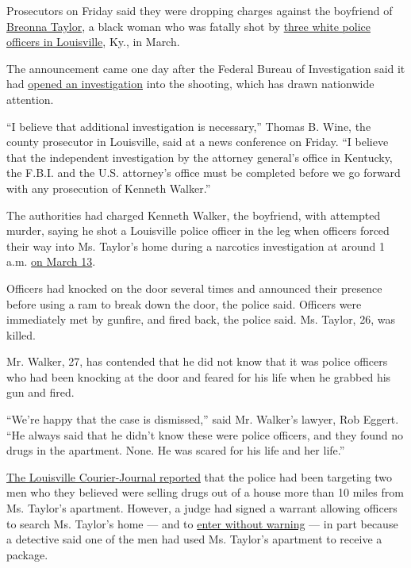 Prosecutors on Friday said they were dropping charges against the
boyfriend of
\href{https://www.nytimes3xbfgragh.onion/2020/08/30/us/breonna-taylor-police-killing.html}{Breonna
Taylor}, a black woman who was fatally shot by
\href{https://www.nytimes3xbfgragh.onion/2020/06/19/us/brett-hankison-breonna-taylor-louisville.html}{three
white police officers in Louisville}, Ky., in March.

The announcement came one day after the Federal Bureau of Investigation
said it had
\href{https://www.nytimes3xbfgragh.onion/2020/05/21/us/fbi-louisville-shooting.html}{opened
an investigation} into the shooting, which has drawn nationwide
attention.

``I believe that additional investigation is necessary,'' Thomas B.
Wine, the county prosecutor in Louisville, said at a news conference on
Friday. ``I believe that the independent investigation by the attorney
general's office in Kentucky, the F.B.I. and the U.S. attorney's office
must be completed before we go forward with any prosecution of Kenneth
Walker.''

The authorities had charged Kenneth Walker, the boyfriend, with
attempted murder, saying he shot a Louisville police officer in the leg
when officers forced their way into Ms. Taylor's home during a narcotics
investigation at around 1 a.m.
\href{https://www.courier-journal.com/story/news/crime/2020/03/13/louisville-police-officer-shot-suspect-killed-springfield-drive/5040349002/}{on
March 13}.

Officers had knocked on the door several times and announced their
presence before using a ram to break down the door, the police said.
Officers were immediately met by gunfire, and fired back, the police
said. Ms. Taylor, 26, was killed.

Mr. Walker, 27, has contended that he did not know that it was police
officers who had been knocking at the door and feared for his life when
he grabbed his gun and fired.

``We're happy that the case is dismissed,'' said Mr. Walker's lawyer,
Rob Eggert. ``He always said that he didn't know these were police
officers, and they found no drugs in the apartment. None. He was scared
for his life and her life.''

\href{https://www.courier-journal.com/story/news/2020/05/12/breonna-taylor-louisville-emt-not-main-target-drug-investigation/3115928001/}{The
Louisville Courier-Journal reported} that the police had been targeting
two men who they believed were selling drugs out of a house more than 10
miles from Ms. Taylor's apartment. However, a judge had signed a warrant
allowing officers to search Ms. Taylor's home --- and to
\href{https://www.nytimes3xbfgragh.onion/interactive/2017/03/18/us/forced-entry-warrant-drug-raid.html}{enter
without warning} --- in part because a detective said one of the men had
used Ms. Taylor's apartment to receive a package.

